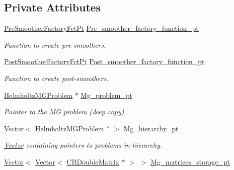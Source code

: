 \subsection*{Private Attributes}
\begin{DoxyCompactItemize}
\item 
\hyperlink{classoomph_1_1HelmholtzMGPreconditioner_ac17ab35f36cad29ce8f1e64593c90a95}{Pre\+Smoother\+Factory\+Fct\+Pt} \hyperlink{classoomph_1_1HelmholtzMGPreconditioner_a22d2d1b715d6789ea56301d79a952d6a}{Pre\+\_\+smoother\+\_\+factory\+\_\+function\+\_\+pt}
\begin{DoxyCompactList}\small\item\em Function to create pre-\/smoothers. \end{DoxyCompactList}\item 
\hyperlink{classoomph_1_1HelmholtzMGPreconditioner_a3405bc1f75c5e1e83601cd9b0e02634b}{Post\+Smoother\+Factory\+Fct\+Pt} \hyperlink{classoomph_1_1HelmholtzMGPreconditioner_a6c837962598479ba2eafd3978fccab9c}{Post\+\_\+smoother\+\_\+factory\+\_\+function\+\_\+pt}
\begin{DoxyCompactList}\small\item\em Function to create post-\/smoothers. \end{DoxyCompactList}\item 
\hyperlink{classoomph_1_1HelmholtzMGProblem}{Helmholtz\+M\+G\+Problem} $\ast$ \hyperlink{classoomph_1_1HelmholtzMGPreconditioner_abfc68dd81954261a2d5dbdc891c4aa67}{Mg\+\_\+problem\+\_\+pt}
\begin{DoxyCompactList}\small\item\em Pointer to the MG problem (deep copy) \end{DoxyCompactList}\item 
\hyperlink{classoomph_1_1Vector}{Vector}$<$ \hyperlink{classoomph_1_1HelmholtzMGProblem}{Helmholtz\+M\+G\+Problem} $\ast$ $>$ \hyperlink{classoomph_1_1HelmholtzMGPreconditioner_a77c24f2c136211274a0f0326694eff51}{Mg\+\_\+hierarchy\+\_\+pt}
\begin{DoxyCompactList}\small\item\em \hyperlink{classoomph_1_1Vector}{Vector} containing pointers to problems in hierarchy. \end{DoxyCompactList}\item 
\hyperlink{classoomph_1_1Vector}{Vector}$<$ \hyperlink{classoomph_1_1Vector}{Vector}$<$ \hyperlink{classoomph_1_1CRDoubleMatrix}{C\+R\+Double\+Matrix} $\ast$ $>$ $>$ \hyperlink{classoomph_1_1HelmholtzMGPreconditioner_ae916b035dd57061a64cef1314ef50d0c}{Mg\+\_\+matrices\+\_\+storage\+\_\+pt}

\end{DoxyCompactItemize}
